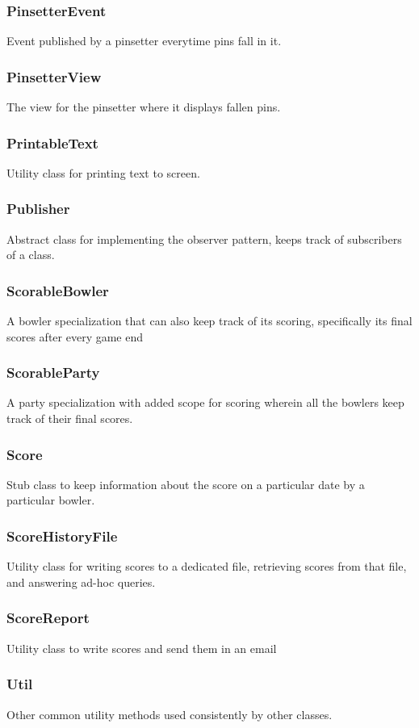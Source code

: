 \subsubsection{PinsetterEvent}
Event published by a pinsetter everytime pins fall in it.

\subsubsection{PinsetterView}
The view for the pinsetter where it displays fallen pins.

\subsubsection{PrintableText}
Utility class for printing text to screen.

\subsubsection{Publisher}
Abstract class for implementing the observer pattern, keeps track of subscribers of a class.

\subsubsection{ScorableBowler}
A bowler specialization that can also keep track of its scoring, specifically its final scores after every game end

\subsubsection{ScorableParty}
A party specialization with added scope for scoring wherein all the bowlers keep track of their final scores.

\subsubsection{Score}
Stub class to keep information about the score on a particular date by a particular bowler.

\subsubsection{ScoreHistoryFile}
Utility class for writing scores to a dedicated file, retrieving scores from that file, and answering ad-hoc queries.

\subsubsection{ScoreReport}
Utility class to write scores and send them in an email

\subsubsection{Util}
Other common utility methods used consistently by other classes.